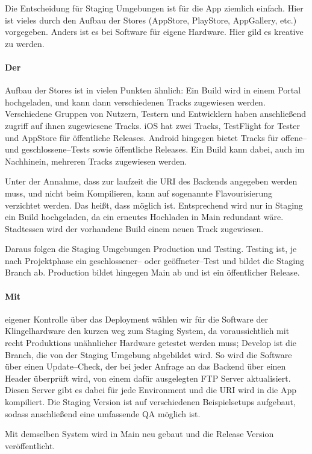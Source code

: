 Die Entscheidung für Staging Umgebungen ist für die App ziemlich einfach.
Hier ist vieles durch den Aufbau der Stores (AppStore, PlayStore, AppGallery, etc.) vorgegeben.
Anders ist es bei Software für eigene Hardware.
Hier gild es kreative zu werden.


\paragraph{Der} Aufbau der Stores ist in vielen Punkten ähnlich:
    Ein Build wird in einem Portal hochgeladen, und kann dann verschiedenen Tracks zugewiesen werden.
    Verschiedene Gruppen von Nutzern, Testern und Entwicklern haben anschließend zugriff auf ihnen zugewiesene Tracks.
    iOS hat zwei Tracks, TestFlight for Tester und AppStore für öffentliche Releases.
    Android hingegen bietet Tracks für offene-- und geschlossene--Tests sowie öffentliche Releases.
    Ein Build kann dabei, auch im Nachhinein, mehreren Tracks zugewiesen werden.


    Unter der Annahme, dass zur laufzeit die URI des Backends angegeben werden muss, und nicht beim Kompilieren, kann auf sogenannte Flavourisierung verzichtet werden.
    Das heißt, dass  möglich ist.
    Entsprechend wird nur in Staging ein Build hochgeladen, da ein erneutes Hochladen in Main redundant wäre.
    Stadtessen wird der vorhandene Build einem neuen Track zugewiesen.


    Daraus folgen die Staging Umgebungen Production und Testing.
    Testing ist, je nach Projektphase ein geschlossener-- oder geöffneter--Test und bildet die Staging Branch ab.
    Production bildet hingegen Main ab und ist ein öffentlicher Release.


\paragraph{Mit} eigener Kontrolle über das Deployment wählen wir für die Software der Klingelhardware den kurzen weg zum Staging System, da voraussichtlich mit recht Produktions unähnlicher Hardware getestet werden muss;
    Develop ist die Branch, die von der Staging Umgebung abgebildet wird.
    So wird die Software über einen Update--Check, der bei jeder Anfrage an das Backend über einen Header überprüft wird, von einem dafür ausgelegten FTP Server aktualisiert.
    Diesen Server gibt es dabei für jede Environment und die URI wird in die App kompiliert.
    Die Staging Version ist auf verschiedenen Beispielsetups aufgebaut, sodass anschließend eine umfassende QA möglich ist.


    Mit demselben System wird in Main neu gebaut und die Release Version veröffentlicht.